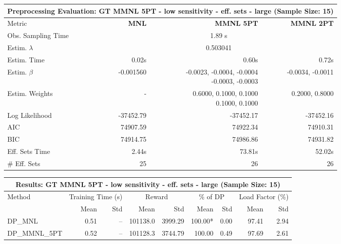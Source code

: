 
\begin{samepage}
\begin{center}
  \small
  \begin{tabular}{l|r|r|r}
    \toprule
    \multicolumn{4}{c}{\textbf{Preprocessing Evaluation: GT MMNL 5PT - low sensitivity - eff. sets - large (Sample Size: 15)}} \\
    \midrule
    Metric & \textbf{MNL} & \textbf{MMNL 5PT} & \textbf{MMNL 2PT} \\
    \midrule
    Obs. Sampling Time & \multicolumn{3}{c}{1.89 s} \\
    Estim. $\lambda$ & \multicolumn{3}{c}{0.503041} \\
    Estim. Time & 0.02s & 0.60s & 0.72s \\
    Estim. $\beta$ & -0.001560 & \makecell[tr]{-0.0023, -0.0004, -0.0004 \\ -0.0003, -0.0003} & -0.0034, -0.0011 \\
    Estim. Weights & - & \makecell[tr]{0.6000, 0.1000, 0.1000 \\ 0.1000, 0.1000} & 0.2000, 0.8000 \\
    Log Likelihood & -37452.79 & -37452.17 & -37452.16 \\
    AIC & 74907.59 & 74922.34 & 74910.31 \\
    BIC & 74914.75 & 74986.86 & 74931.82 \\
    Eff. Sets Time & 2.44s & 73.81s & 52.02s \\
    \# Eff. Sets & 25 & 26 & 26 \\
    \bottomrule
  \end{tabular}
\end{center}
\begin{center}
  \small
  \begin{tabular}{l|rr|rr|rr|rr}
    \toprule
    \multicolumn{9}{c}{\textbf{Results: GT MMNL 5PT - low sensitivity - eff. sets - large (Sample Size: 15)}} \\
    \midrule
    Method & \multicolumn{2}{c|}{Training Time (s)} & \multicolumn{2}{c|}{Reward} & \multicolumn{2}{c|}{\% of DP} & \multicolumn{2}{c}{Load Factor (\%)} \\
    & Mean & Std & Mean & Std & Mean & Std & Mean & Std \\
    \midrule
    DP\_MNL      &     0.51 &    -- &   101138.0 &    3999.29 & 100.00* &    0.00 &   97.41 &    2.94 \\
    DP\_MMNL\_5PT &     0.52 &    -- &   101128.3 &    3744.79 &  100.00 &    0.49 &   97.69 &    2.61 \\

\end{tabular}
\end{center}
\end{samepage}
